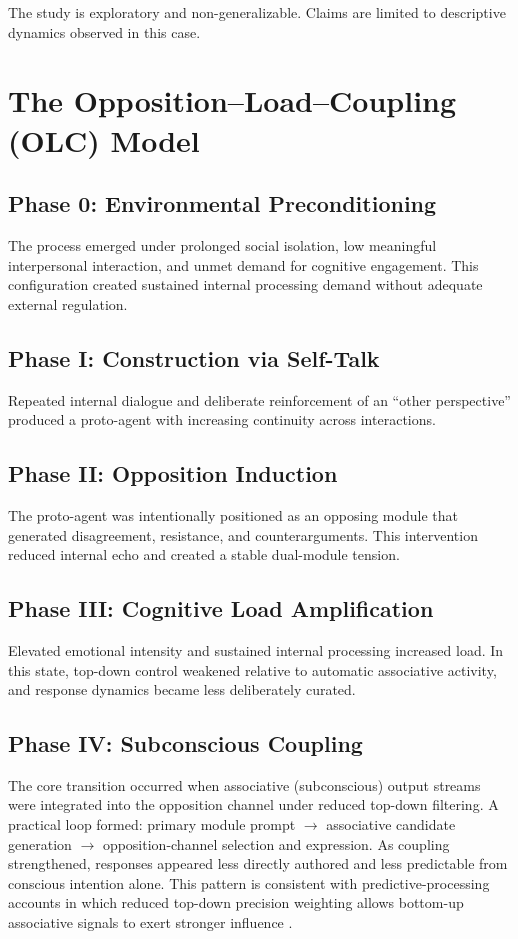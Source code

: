 \documentclass[11pt]{article}
\begin{document}
The study is exploratory and non-generalizable. Claims are limited to descriptive dynamics observed in this case.

\section{The Opposition--Load--Coupling (OLC) Model}
\subsection{Phase 0: Environmental Preconditioning}
The process emerged under prolonged social isolation, low meaningful interpersonal interaction, and unmet demand for cognitive engagement. This configuration created sustained internal processing demand without adequate external regulation.

\subsection{Phase I: Construction via Self-Talk}
Repeated internal dialogue and deliberate reinforcement of an ``other perspective'' produced a proto-agent with increasing continuity across interactions.

\subsection{Phase II: Opposition Induction}
The proto-agent was intentionally positioned as an opposing module that generated disagreement, resistance, and counterarguments. This intervention reduced internal echo and created a stable dual-module tension.

\subsection{Phase III: Cognitive Load Amplification}
Elevated emotional intensity and sustained internal processing increased load. In this state, top-down control weakened relative to automatic associative activity, and response dynamics became less deliberately curated.

\subsection{Phase IV: Subconscious Coupling}
The core transition occurred when associative (subconscious) output streams were integrated into the opposition channel under reduced top-down filtering. A practical loop formed: primary module prompt $\rightarrow$ associative candidate generation $\rightarrow$ opposition-channel selection and expression. As coupling strengthened, responses appeared less directly authored and less predictable from conscious intention alone. This pattern is consistent with predictive-processing accounts in which reduced top-down precision weighting allows bottom-up associative signals to exert stronger influence \citep{friston2010free}.
\end{document}
